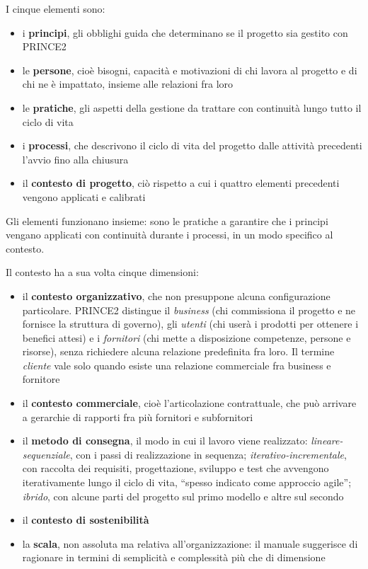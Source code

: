 I cinque elementi sono:
\begin {itemize}
\item i \textbf{principi}, gli obblighi guida che determinano se il progetto sia
gestito con PRINCE2
\item le \textbf{persone}, cio\`e bisogni, capacit\`a e motivazioni di chi
lavora al progetto e di chi ne \`e impattato, insieme alle relazioni fra loro
\item le \textbf{pratiche}, gli aspetti della gestione da trattare con
continuit\`a lungo tutto il ciclo di vita
\item i \textbf{processi}, che descrivono il ciclo di vita del progetto dalle
attivit\`a precedenti l'avvio fino alla chiusura
\item il \textbf{contesto di progetto}, ci\`o rispetto a cui i quattro elementi
precedenti vengono applicati e calibrati
\end {itemize}
Gli elementi funzionano insieme: sono le pratiche a garantire che i principi
vengano applicati con continuit\`a durante i processi, in un modo specifico al
contesto.

Il contesto ha a sua volta cinque dimensioni:
\begin {itemize}
\item il \textbf{contesto organizzativo}, che non presuppone alcuna
configurazione particolare. PRINCE2 distingue il \emph{business} (chi
commissiona il progetto e ne fornisce la struttura di governo), gli
\emph{utenti} (chi user\`a i prodotti per ottenere i benefici attesi) e i
\emph{fornitori} (chi mette a disposizione competenze, persone e risorse), senza
richiedere alcuna relazione predefinita fra loro. Il termine \emph{cliente} vale
solo quando esiste una relazione commerciale fra business e fornitore
\item il \textbf{contesto commerciale}, cio\`e l'articolazione contrattuale, che
pu\`o arrivare a gerarchie di rapporti fra pi\`u fornitori e subfornitori
\item il \textbf{metodo di consegna}, il modo in cui il
lavoro viene realizzato: \emph{lineare-sequenziale}, con i passi di
realizzazione in sequenza; \emph{iterativo-incrementale}, con raccolta dei
requisiti, progettazione, sviluppo e test che avvengono iterativamente lungo il
ciclo di vita, ``spesso indicato come approccio agile''; \emph{ibrido}, con
alcune parti del progetto sul primo modello e altre sul secondo
\item il \textbf{contesto di sostenibilit\`a}
\item la \textbf{scala}, non assoluta ma relativa all'organizzazione: il manuale
suggerisce di ragionare in termini di semplicit\`a e complessit\`a pi\`u che di
dimensione
\end {itemize}

